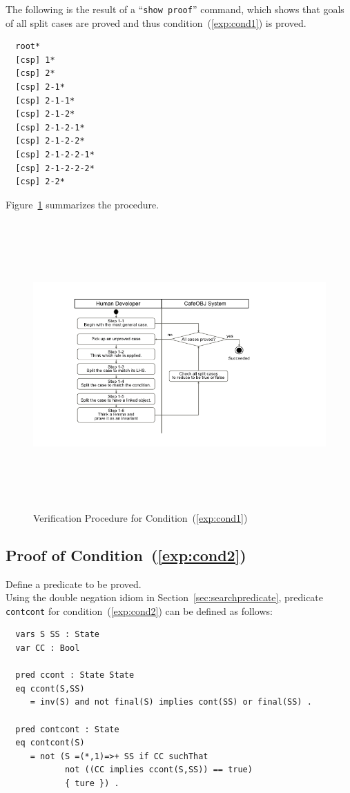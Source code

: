 \documentclass[12pt]{report}
\newcommand{\stt}[1]{{\small{\tt {#1}}}}
\begin{document}
The following is the result of a ``\stt{show proof}'' command, which shows
that goals of all split cases are proved and thus
condition~(\ref{exp:cond1}) is proved.
\small
\begin{verbatim}
  root*
  [csp] 1*
  [csp] 2*
  [csp] 2-1*
  [csp] 2-1-1*
  [csp] 2-1-2*
  [csp] 2-1-2-1*
  [csp] 2-1-2-2*
  [csp] 2-1-2-2-1*
  [csp] 2-1-2-2-2*
  [csp] 2-2*
\end{verbatim}
\normalsize

Figure~\ref{fig:procedure1} summarizes the procedure.
\begin{figure}
\centering
\includegraphics[height=11cm,natwidth=720,natheight=405,clip,trim=100 55 190 40]{procedure1.png}
\caption{Verification Procedure for Condition~(\ref{exp:cond1})}
\label{fig:procedure1}
\end{figure}

\subsection{Proof of Condition~(\ref{exp:cond2})}
\label{sec:TOSCAcontcont}
 Define a predicate to be proved. \\ Using the
double negation idiom in Section~\ref{sec:searchpredicate}, predicate
{\tt contcont} for condition~(\ref{exp:cond2}) can be defined as follows:
\small
\begin{verbatim}
  vars S SS : State
  var CC : Bool

  pred ccont : State State
  eq ccont(S,SS)
     = inv(S) and not final(S) implies cont(SS) or final(SS) .

  pred contcont : State
  eq contcont(S)
     = not (S =(*,1)=>+ SS if CC suchThat
            not ((CC implies ccont(S,SS)) == true)
            { ture }) .
\end{verbatim}
\normalsize
\end{document}
